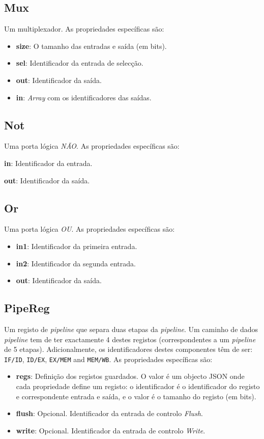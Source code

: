 \documentclass[11pt,a4paper,twoside,titlepage]{report}
\begin{document}
\subsection{Mux}

Um multiplexador. As propriedades específicas são:
\begin{itemize}
	\item \textbf{size}: O tamanho das entradas e saída (em bits).
	\item \textbf{sel}: Identificador da entrada de selecção.
	\item \textbf{out}: Identificador da saída.
	\item \textbf{in}: \emph{Array} com os identificadores das saídas.
\end{itemize}

\subsection{Not}

Uma porta lógica \emph{NÃO}. As propriedades específicas são:
\begin{itemize}

\end{itemize}
	\item \textbf{in}: Identificador da entrada.
	\item \textbf{out}: Identificador da saída.
\subsection{Or}

Uma porta lógica \emph{OU}. As propriedades específicas são:
\begin{itemize}
	\item \textbf{in1}: Identificador da primeira entrada.
	\item \textbf{in2}: Identificador da segunda entrada.
	\item \textbf{out}: Identificador da saída.
\end{itemize}

\subsection{PipeReg}

Um registo de \emph{pipeline} que separa duas etapas da \emph{pipeline}.
Um caminho de dados \emph{pipeline} tem de ter exactamente 4 destes registos
(correspondentes a um \emph{pipeline} de 5 etapas). Adicionalmente, os
identificadores destes componentes têm de ser:
\verb+IF/ID+, \verb+ID/EX+, \verb+EX/MEM+ and \verb+MEM/WB+.
As propriedades específicas são:
\begin{itemize}
	\item \textbf{regs}: Definição dos registos guardados. O valor é um objecto
		JSON onde cada propriedade define um registo: o identificador é o
		identificador do registo e correspondente entrada e saída, e o valor é o
		tamanho do registo (em bits).
	\item \textbf{flush}: Opcional. Identificador da entrada de controlo \emph{Flush}.
	\item \textbf{write}: Opcional. Identificador da entrada de controlo \emph{Write}.
\end{itemize}
\end{document}
